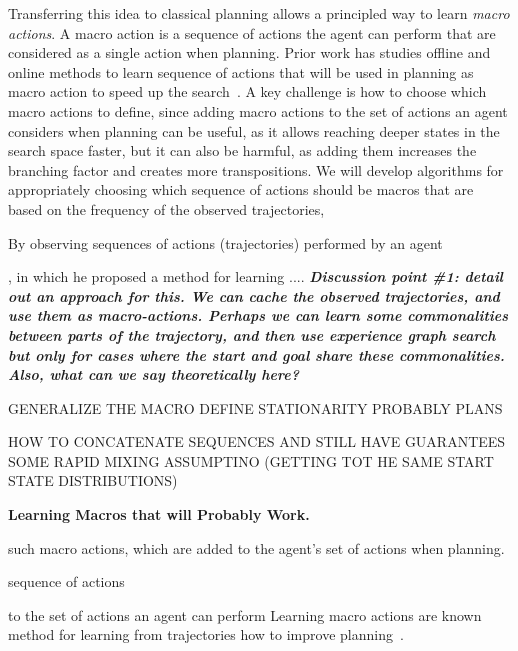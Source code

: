 \documentclass[12pt]{article}
\newcommand{\note}[1]{\textbf{\textit{#1}}}
\begin{document}
Transferring this idea to classical planning allows a principled way to learn {\em macro actions}. A macro action is a sequence of actions the agent can perform that are considered as a single action when planning. 
Prior work has studies offline and online methods to learn sequence of actions that will be used in planning as macro action to speed up the search~\cite{}. A key challenge is how to choose which macro actions to define, since adding macro actions to the set of actions an agent considers when planning can be useful, as it allows reaching deeper states in the search space faster, but it can also be harmful, as adding them increases the branching factor and creates more transpositions. We will develop algorithms for appropriately choosing which sequence of actions should be macros that are based on the frequency of the observed trajectories, 






By observing 
sequences of actions (trajectories) performed by an agent 

, in which he proposed a method for learning .... 
\note{Discussion point \#1: detail out an approach for this. We can cache the observed trajectories, and use them as macro-actions. Perhaps we can learn some commonalities between parts of the trajectory, and then use experience graph search but only for cases where the start and goal share these commonalities. Also, what can we say theoretically here?}




GENERALIZE THE MACRO
DEFINE STATIONARITY 
PROBABLY PLANS

HOW TO CONCATENATE SEQUENCES AND STILL HAVE GUARANTEES
SOME RAPID MIXING ASSUMPTINO (GETTING TOT HE SAME START STATE DISTRIBUTIONS)


{\bf Learning Macros that will Probably Work.} 


such macro actions, 
which are added to the agent's set of actions when planning. 

sequence of actions 


to the set of actions an agent can perform
Learning macro actions are known method for learning from trajectories how to improve planning~\cite{korf,others,chrpa2014mum}. 



\end{document}
